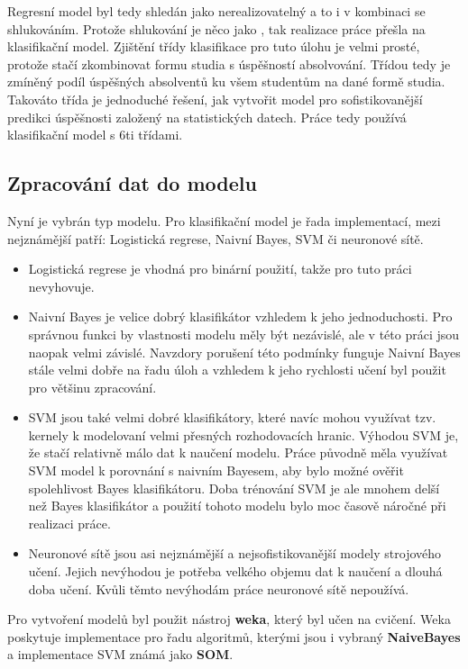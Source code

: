 \documentclass[12pt, letterpaper]{article}
\begin{document}
Regresní model byl tedy shledán jako nerealizovatelný a to i v kombinaci se shlukováním. Protože shlukování je něco jako
, tak realizace práce přešla na klasifikační model. Zjištění třídy klasifikace pro tuto úlohu
je velmi prosté, protože stačí zkombinovat formu studia s úspěšností absolvování. Třídou tedy je zmíněný podíl
úspěšných absolventů ku všem studentům na dané formě studia. Takováto třída je jednoduché řešení, jak vytvořit model 
pro sofistikovanější predikci úspěšnosti založený na statistických datech. Práce tedy používá klasifikační model 
s 6ti třídami.
\subsection{Zpracování dat do modelu}
Nyní je vybrán typ modelu. Pro klasifikační model je řada implementací, mezi nejznámější patří: Logistická regrese, 
Naivní Bayes, SVM či neuronové sítě. 
\begin{itemize}
    \item Logistická regrese je vhodná pro binární použití, takže pro tuto práci nevyhovuje.
    \item Naivní Bayes je velice dobrý klasifikátor vzhledem k jeho jednoduchosti. Pro správnou funkci by vlastnosti modelu měly 
        být nezávislé, ale v této práci jsou naopak velmi závislé. Navzdory porušení této podmínky funguje Naivní Bayes stále 
        velmi dobře na řadu úloh a vzhledem k jeho rychlosti učení byl použit pro většinu zpracování.
    \item SVM jsou také velmi dobré klasifikátory, které navíc mohou využívat tzv. kernely k modelovaní velmi přesných 
        rozhodovacích hranic. Výhodou SVM je, že stačí relativně málo dat k naučení modelu. Práce původně měla 
        využívat SVM model k porovnání s naivním Bayesem, aby bylo možné ověřit spolehlivost Bayes klasifikátoru. 
        Doba trénování SVM je ale mnohem delší než Bayes klasifikátor a použití tohoto modelu bylo moc časově náročné 
        při realizaci práce.
    \item Neuronové sítě jsou asi nejznámější a nejsofistikovanější modely strojového učení. Jejich nevýhodou je 
        potřeba velkého objemu dat k naučení a dlouhá doba učení. Kvůli těmto nevýhodám práce neuronové sítě nepoužívá.
\end{itemize}

Pro vytvoření modelů byl použit nástroj \textbf{weka}, který byl učen na cvičení. Weka poskytuje implementace pro řadu
algoritmů, kterými jsou i vybraný \textbf{NaiveBayes} a implementace SVM známá jako \textbf{SOM}.
\end{document}
